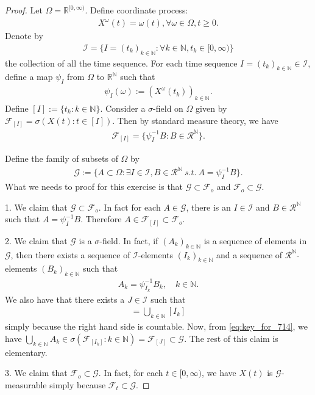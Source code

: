\documentclass[12pt,a4paper]{amsart}
\theoremstyle{plain}
\theoremstyle{definition}
\theoremstyle{remark}
\numberwithin{equation}{section}
\begin{document}
\begin{proof}

Let $\Omega = \mathbb R^{[0,\infty)}$. 
Define coordinate process:
\begin{align}
X^{\omega}(t) = \omega(t), \forall \omega \in \Omega, t\geq 0.
\end{align}
Denote by 
\begin{align}
\mathcal I = \{I = (t_k)_{k \in \mathbb N}: \forall k \in \mathbb N, t_k \in [0,\infty)\}
\end{align}
the collection of all the time sequence.
For each time sequence $I=(t_k)_{k \in \mathbb N}\in \mathcal I$, define a map $\psi_I$ from $\Omega$ to $\mathbb R^{\mathbb N}$ such that
\begin{align}
\psi_I(\omega):= (X^{\omega}(t_k))_{k \in \mathbb N}.
\end{align}
Define $[I] := \{t_k: k \in \mathbb N\}$.
Consider a $\sigma$-field on $\Omega$ given by $\mathcal F_{[I]} = \sigma( X(t): t \in [I])$. 
Then by standard measure theory, we have 
\begin{align}
\label{eq:key_for_714}
\mathcal F_{[I]} = \{ \psi_I^{-1} B: B \in \mathcal R^{\mathbb N}\}.
\end{align}

Define the family of subsets of $\Omega$ by 
\begin{align}
\mathcal G := \{A \subset \Omega: \exists I \in \mathcal I, B \in \mathcal R^\mathbb N~s.t.~A = \psi_I^{-1} B\}.
\end{align}
What we needs to proof for this exercise is that $\mathcal G \subset \mathcal F_o$ and $\mathcal F_o \subset \mathcal G$.

1. We claim that $\mathcal G \subset \mathcal F_o$. 
In fact for each $ A \in \mathcal G$, there is an $I \in \mathcal I$ and $B \in \mathcal R^\mathbb N$ such that $A = \psi_I^{-1}B$. 
Therefore $ A \in \mathcal F_{[I]} \subset \mathcal F_o$.

2. We claim that $\mathcal G$ is a $\sigma$-field. 
In fact, if $(A_k)_{k \in \mathbb N}$ is a sequence of elements in $\mathcal G$, then there exists a sequence of $\mathcal I$-elements $(I_k)_{k \in \mathbb N}$ and a sequence of $\mathcal R^\mathbb N$-elements $(B_k)_{k \in \mathbb N}$ such that
\begin{align}
A_k = \psi_{I_k}^{-1}B_k, \quad k \in \mathbb N.
\end{align}
We also have that there exists a $J \in \mathcal I$ such that
\begin{align}
[J] = \bigcup_{k \in \mathbb N} [I_k]
\end{align}
simply because the right hand side is countable. 
Now, from \eqref{eq:key_for_714}, we have $\bigcup_{k\in \mathbb N} A_k \in \sigma(\mathcal F_{[I_k]}: k \in \mathbb N) = \mathcal F_{[J]}\subset \mathcal G$. 
The rest of this claim is elementary.

3. We claim that $\mathcal F_o \subset \mathcal G$. In fact, for each $t\in [0, \infty)$, we have $X(t)$ is $\mathcal G$-measurable simply because $\mathcal F_{t}\subset \mathcal G$. 
\end{proof}
\end{document}

